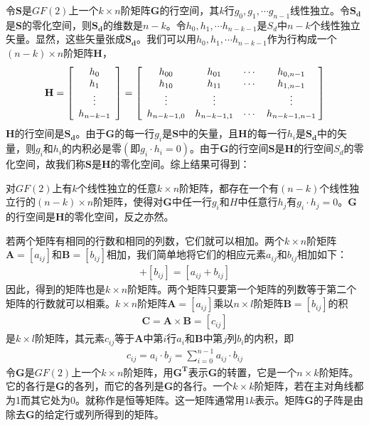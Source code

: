 令$\mathbf{S}$是$GF(2)$上一个$k\times
n$阶矩阵$\mathbf{G}$的行空间，其$k$行$g_0,g_1,\cdots
g_{n-1}$线性独立。令$\mathbf{S_d}$是$\mathbf{S}$的零化空间，则$\mathbf{S_d}$的维数是$n-k$。令$h_0,h_1,\cdots
h_{n-k-1}$是$S_d$中$n-k$个线性独立矢量。显然，这些矢量张成$\mathbf{S_d}$。我们可以用$h_0,h_1,\cdots
h_{n-k-1}$作为行构成一个$(n-k)\times n$阶矩阵$\mathbf{H}$，
\begin{eqnarray}
  \mathbf{H}=\left[
  \begin{array}{c}
    h_0\\
    h_1\\
    \vdots \\
    h_{n-k-1}
  \end{array}
    \right]
    =\left[
    \begin{array}{*{4}c@{\:}}
      h_{00}&h_{01}&\cdots &h_{0,n-1}\\
      h_{10}&h_{11}&\cdots &h_{1,n-1}\\
      \vdots&\vdots& &\vdots\\
      h_{n-k-1,0}&h_{n-k-1,1}&\cdots &h_{n-k-1,n-1}
    \end{array}
    \right]
  \label{equ:juzheng3}
\end{eqnarray}
$\mathbf{H}$的行空间是$\mathbf{S_d}$。由于$\mathbf{G}$的每一行$g_i$是$\mathbf{S}$中的矢量，且$\mathbf{H}$的每一行$h_i$是$\mathbf{S_d}$中的矢量，则$g_i\mbox{和}h_i$的内积必是零$(\mbox{即}g_i\cdot
h_i
=0)$。由于$\mathbf{G}$的行空间$\mathbf{S}$是$\mathbf{H}$的行空间$S_d$的零化空间，故我们称$\mathbf{S}$是$\mathbf{H}$的零化空间。综上结果可得到：
\begin{ioatheorem}
  对$GF(2)$上有$k$个线性独立的任意$k\times
  n$阶矩阵，都存在一个有$(n-k)$个线性独立行的$(n-k)\times
  n$阶矩阵，使得对$\mathbf{G}$中任一行$g_i$和$H$中任意行$h_j$有$g_i\cdot
  h_j=0$。$\mathbf{G}$的行空间是$\mathbf{H}$的零化空间，反之亦然。
  \label{theorem:2.10}
\end{ioatheorem}
若两个矩阵有相同的行数和相同的列数，它们就可以相加。两个$k\times
n$阶矩阵$\mathbf{A}=[a_{ij}]$和$\mathbf{B}=[b_{ij}]$相加，我们简单地将它们的相应元素$a_{ij}\mbox{和}b_{ij}$相加如下：
\begin{eqnarray}
  [a_{ij}]+[b_{ij}]=[a_{ij}+b_{ij}]
  \label{equ:juzheng4}
\end{eqnarray}
因此，得到的矩阵也是$k\times
n$阶矩阵。两个矩阵只要第一个矩阵的列数等于第二个矩阵的行数就可以相乘。$k\times
n$阶矩阵$\mathbf{A}=[a_{ij}]$乘以$n\times l$阶矩阵$\mathbf{B}=[b_{ij}]$的积
\begin{eqnarray}
  \mathbf{C}=\mathbf{A}\times\mathbf{B}=[c_{ij}]
  \label{equ:juzheng5}
\end{eqnarray}
是$k\times
l$阶矩阵，其元素$c_{ij}$等于$\mathbf{A}$中第$i$行$a_i$和$\mathbf{B}$中第$j$列$b_i$的内积，即
\begin{eqnarray}
  c_{ij}=a_i\cdot b_j =\sum_{i=0}^{n-1}{a_{ij}\cdot b_{ij}}
  \label{equ:juzheng6}
\end{eqnarray}
令$\mathbf{G}$是$GF(2)$上一个$k\times
n$阶矩阵，用$\mathbf{G^T}$表示$\mathbf{G}$的转置，它是一个$n\times
k$阶矩阵。它的各行是$\mathbf{G}$的各列，而它的各列是$\mathbf{G}$的各行。一个$k\times
k$阶矩阵，若在主对角线都为1而其它处为0。就称作是恒等矩阵。这一矩阵通常用$1k$表示。矩阵$\mathbf{G}$的子阵是由除去$\mathbf{G}$的给定行或列所得到的矩阵。

